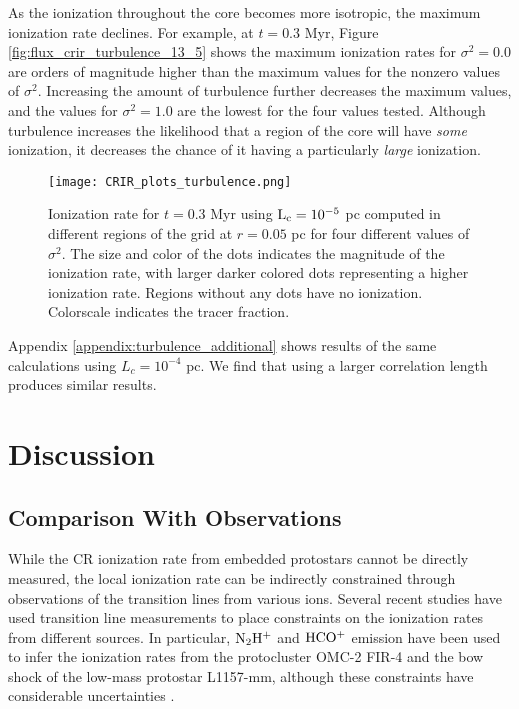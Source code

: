 \documentclass[twocolumn]{aastex63}
\begin{document}
As the ionization throughout the core becomes more isotropic, the maximum ionization rate declines.  For example, at $t=0.3$ Myr, Figure \ref{fig:flux_crir_turbulence_13_5} shows the maximum ionization rates for $\sigma^2=0.0$ are orders of magnitude higher than the maximum values for the nonzero values of $\sigma^2$. Increasing the amount of turbulence further decreases the maximum values, and the values for $\sigma^2=1.0$ are the lowest for the four values tested. Although turbulence increases the likelihood that a region of the core will have \textit{some} ionization, it decreases the chance of it having a particularly \textit{large} ionization.

\begin{figure*}
\centering
\texttt{[image: CRIR\_plots\_turbulence.png]}
\caption{Ionization rate for $t=0.3$ Myr using $\rm L_c=10^{-5}$ pc computed in different regions of the grid at $r=0.05$ pc for four different values of $\sigma^2$. The size and color of the dots indicates the magnitude of the ionization rate, with larger darker colored dots representing a higher ionization rate. Regions without any dots have no ionization. Colorscale indicates the tracer fraction.}
\label{fig:flux_crir_turbulence}
\end{figure*}

Appendix \ref{appendix:turbulence_additional} shows results of the same calculations using $L_c=10^{-4}$ pc. We find that using a larger correlation length produces similar results.

\section{Discussion}
\label{section:discussion}

\subsection{Comparison With Observations}
\label{subsection:observations}

While the CR ionization rate from embedded protostars cannot be directly measured, the local ionization rate can be indirectly constrained through observations of the transition lines from various ions.  Several recent studies have used transition line measurements to place constraints on the ionization rates from different sources. In particular, $\rm N_2 H^+$ and $\rm HCO^+$ emission have been used to infer the ionization rates from the protocluster OMC-2 FIR-4 and the bow shock of the low-mass protostar L1157-mm, although these constraints have considerable uncertainties \citep{gaches_2019_mc1}.
\end{document}

